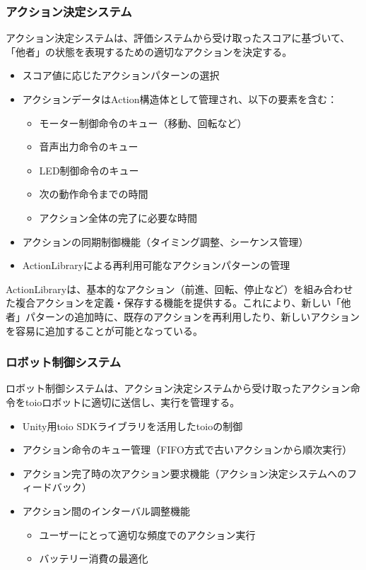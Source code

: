\documentclass{cuxarticle}
\begin{document}
\subsubsection{アクション決定システム}
アクション決定システムは、評価システムから受け取ったスコアに基づいて、「他者」の状態を表現するための適切なアクションを決定する。

\begin{itemize}
  \item スコア値に応じたアクションパターンの選択
  \item アクションデータはAction構造体として管理され、以下の要素を含む：
    \begin{itemize}
      \item モーター制御命令のキュー（移動、回転など）
      \item 音声出力命令のキュー
      \item LED制御命令のキュー
      \item 次の動作命令までの時間
      \item アクション全体の完了に必要な時間
    \end{itemize}
  \item アクションの同期制御機能（タイミング調整、シーケンス管理）
  \item ActionLibraryによる再利用可能なアクションパターンの管理
\end{itemize}

ActionLibraryは、基本的なアクション（前進、回転、停止など）を組み合わせた複合アクションを定義・保存する機能を提供する。これにより、新しい「他者」パターンの追加時に、既存のアクションを再利用したり、新しいアクションを容易に追加することが可能となっている。

\subsubsection{ロボット制御システム}
ロボット制御システムは、アクション決定システムから受け取ったアクション命令をtoioロボットに適切に送信し、実行を管理する。

\begin{itemize}
  \item Unity用toio SDKライブラリを活用したtoioの制御
  \item アクション命令のキュー管理（FIFO方式で古いアクションから順次実行）
  \item アクション完了時の次アクション要求機能（アクション決定システムへのフィードバック）
  \item アクション間のインターバル調整機能
    \begin{itemize}
      \item ユーザーにとって適切な頻度でのアクション実行
      \item バッテリー消費の最適化
    \end{itemize}
\end{itemize}
\end{document}

